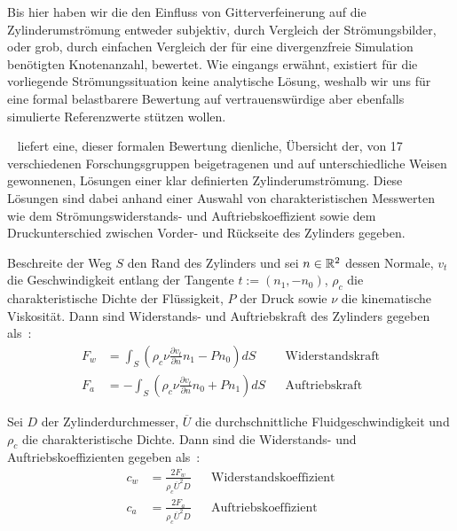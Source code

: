 Bis hier haben wir die den Einfluss von Gitterverfeinerung auf die Zylinderumströmung entweder subjektiv, durch Vergleich der Strömungsbilder, oder grob, durch einfachen Vergleich der für eine divergenzfreie Simulation benötigten Knotenanzahl, bewertet. Wie eingangs erwähnt, existiert für die vorliegende Strömungssituation keine analytische Lösung, weshalb wir uns für eine formal belastbarere Bewertung auf vertrauenswürdige aber ebenfalls simulierte Referenzwerte stützen wollen.

~\cite{SchaeferTurek96} liefert eine, dieser formalen Bewertung dienliche, Übersicht der, von 17 verschiedenen Forschungsgruppen beigetragenen und auf unterschiedliche Weisen gewonnenen, Lösungen einer klar definierten Zylinderumströmung. Diese Lösungen sind dabei anhand einer Auswahl von charakteristischen Messwerten wie dem Strömungswiderstands- und Auftriebskoeffizient sowie dem Druckunterschied zwischen Vorder- und Rückseite des Zylinders gegeben.

\begin{Definition}
	Beschreite der Weg \(S\) den Rand des Zylinders und sei \(n \in \mathbb{R}^2\) dessen Normale, \(v_t\) die Geschwindigkeit entlang der Tangente \(t:=(n_1,-n_0)\), \(\rho_c\) die charakteristische Dichte der Flüssigkeit, \(P\) der Druck sowie \(\nu\) die kinematische Viskosität. Dann sind Widerstands- und Auftriebskraft des Zylinders gegeben als~\cite[Kap.~2.2]{SchaeferTurek96}:
\begin{align*}
F_w &= \int_S \left( \rho_c \nu \frac{\partial v_t}{\partial n} n_1 - P n_0 \right) dS && \text{Widerstandskraft}\\
F_a &= - \int_S \left( \rho_c \nu \frac{\partial v_t}{\partial n} n_0 + P n_1 \right) dS && \text{Auftriebskraft}
\end{align*}
\end{Definition}

\begin{Definition}
Sei \(D\) der Zylinderdurchmesser, \(\overline{U}\) die durchschnittliche Fluidgeschwindigkeit und \(\rho_c\) die charakteristische Dichte. Dann sind die Widerstands- und Auftriebskoeffizienten gegeben als~\cite[Kap.~2.2]{SchaeferTurek96}:
\begin{align*}
c_w &= \frac{2F_w}{\rho_c \overline{U}^2 D} && \text{Widerstandskoeffizient} \\
c_a &= \frac{2F_a}{\rho_c \overline{U}^2 D} && \text{Auftriebskoeffizient}
\end{align*}
\end{Definition}

